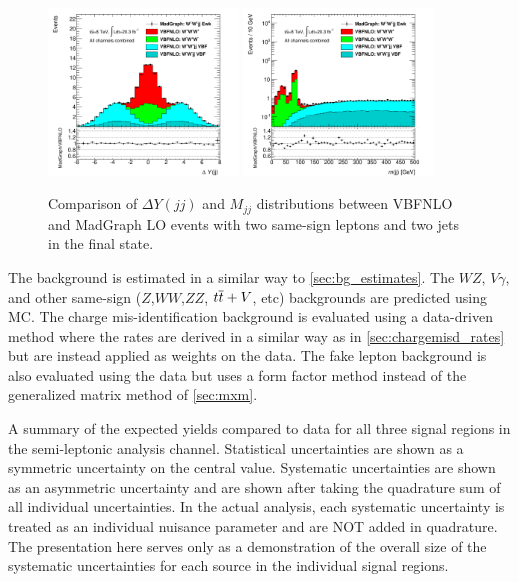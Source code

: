\begin{figure}[h]
  \begin{center}
    \includegraphics[width=0.45\textwidth]{figures/combination/dY2j_linear_ratio.pdf}
    \includegraphics[width=0.45\textwidth]{figures/combination/TwojM_log_ratio.pdf}
  \end{center}
  \caption{Comparison of $\Delta Y(jj)$ and $M_{jj}$ distributions between VBFNLO and MadGraph LO events with two same-sign leptons and two jets in the final state. }
  \label{fig:signal_semilep} 
\end{figure}


The background is estimated in a similar way to \sec\ref{sec:bg_estimates}. The $WZ$, 
$V\gamma$, and other same-sign ($Z$,$WW$,$ZZ$, $t\overline{t}+V$, etc) backgrounds are predicted
using MC. The charge mis-identification background is evaluated using a data-driven method
where the rates are derived in a similar way as in \sec\ref{sec:chargemisd_rates}
but are instead applied as weights on the data.
The fake lepton background is also evaluated using the data but uses a form factor method
instead of the generalized matrix method of \sec\ref{sec:mxm}.


\begin{table}[ht!]
\centering

\caption{A summary of the expected yields compared to data for all 
three signal regions in the semi-leptonic analysis channel.  
Statistical uncertainties are shown 
as a symmetric uncertainty on the central value. Systematic uncertainties 
are shown as an asymmetric uncertainty and are shown
after taking the quadrature sum of all individual uncertainties. 
In the actual analysis, each systematic uncertainty is
treated as an individual nuisance parameter and are NOT added in quadrature.  
The presentation here serves only as a demonstration
of the overall size of the systematic uncertainties for each source in the 
individual signal regions.}
\label{tab:yields_2l2j}
\end{table}

